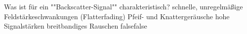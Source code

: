    {Was ist für ein ""Backscatter-Signal"" charakteristisch?}
    {schnelle, unregelmäßige Feldstärkeschwankungen (Flatterfading)}
    {Pfeif- und Knattergeräusche}
    {hohe Signalstärken}
    {breitbandiges Rauschen}
    {false}{false}